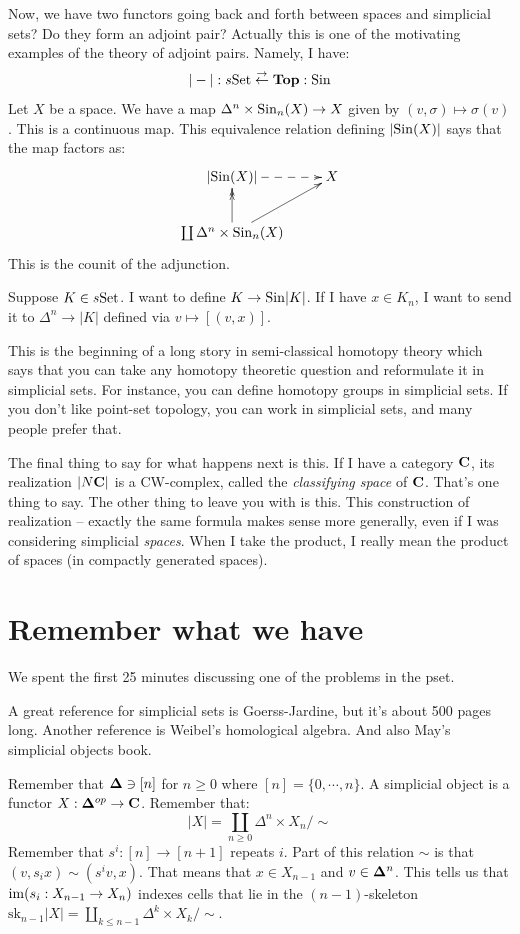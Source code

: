 Now, we have two functors going back and forth between spaces and simplicial sets?
Do they form an adjoint pair?
Actually this is one of the motivating examples of the theory of adjoint pairs. Namely, I have:
$$
|-|:s\mathrm{Set}\stackrel{\rightarrow}{\leftarrow} \mathbf{Top}:\mathrm{Sin}
$$
Let $X$ be a space.
We have a map $\Delta^n\times\mathrm{Sin}_n(X)\to X$ given by $(v,\sigma)\mapsto \sigma(v)$.
This is a continuous map.
This equivalence relation defining $|\mathrm{Sin}(X)|$ says that the map factors as:
\begin{equation*}
    \xymatrix{
	|\Sin(X)|\ar@{-->}[r] & X\\
	\coprod\Delta^n\times\Sin_n(X)\ar[ur]\ar@{->>}[u] &
    }
\end{equation*}
This is the counit of the adjunction.

Suppose $K\in s\mathrm{Set}$. I want to define $K\to\mathrm{Sin}|K|$.
If I have $x\in K_n$, I want to send it to $\Delta^n\to |K|$ defined via $v\mapsto [(v,x)]$.

This is the beginning of a long story in semi-classical homotopy theory which says that you can take any homotopy theoretic question and reformulate it in simplicial sets.
For instance, you can define homotopy groups in simplicial sets.
If you don't like point-set topology, you can work in simplicial sets, and many people prefer that.

The final thing to say for what happens next is this. If I have a category $\mathbf C$, its realization $|N\mathbf C|$ is a CW-complex, called the \emph{classifying space} of $\mathbf C$.
That's one thing to say.
The other thing to leave you with is this.
This construction of realization -- exactly the same formula makes sense more generally, even if I was considering simplicial \emph{spaces}.
When I take the product, I really mean the product of spaces (in compactly generated spaces).
\section{Remember what we have}
We spent the first 25 minutes discussing one of the problems in the pset.

A great reference for simplicial sets is Goerss-Jardine, but it's about 500 pages long.
Another reference is Weibel's homological algebra.
And also May's simplicial objects book.

Remember that ${\mathbf \Delta}\ni[n]$ for $n\geq 0$ where $[n] = \{0,\cdots,n\}$.
A simplicial object is a functor $X:{\mathbf \Delta}^{op}\to\mathbf C$.
Remember that:
$$
|X| = \coprod_{n\geq 0}\Delta^n\times X_n/\sim
$$
Remember that $s^i:[n]\to [n+1]$ repeats $i$. Part of this relation $\sim$ is that $(v,s_i x)\sim (s^i v,x)$.
That means that $x\in X_{n-1}$ and $v\in{\mathbf \Delta}^n$.
This tells us that $\operatorname{im}(s_i:X_{n-1}\to X_{n})$ indexes cells that lie in the $(n-1)$-skeleton $\mathrm{sk}_{n-1}|X| = \coprod_{k\leq n-1}\Delta^k\times X_k/\sim$.

